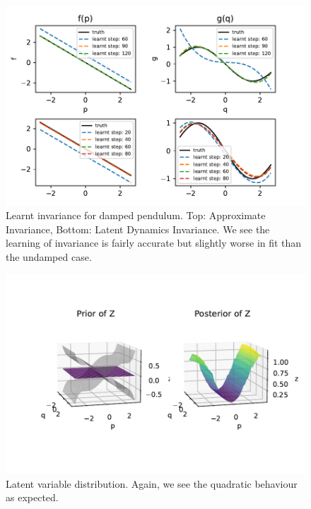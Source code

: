 \documentclass{statsmsc}
\begin{document}
\begin{figure}[H] 
  \includegraphics[width=0.8\linewidth]{../codes/figures/damped_pendulum_learnt_over_time.pdf}
  \centering
  \caption{Learnt invariance for damped pendulum. Top: Approximate Invariance, Bottom: Latent Dynamics Invariance. We see the learning of invariance is fairly accurate but slightly worse in fit than the undamped case.}
  \label{fig:damped_pendulum_learnt}
\end{figure}

\begin{figure}[H] 
  \includegraphics[width=0.8\linewidth]{../codes/figures/latent_damped_pendulum.pdf}
  \centering
  \caption{Latent variable distribution. Again, we see the quadratic behaviour as expected.}
  \label{fig:latent_damped_pendulum}
\end{figure}
\end{document}
